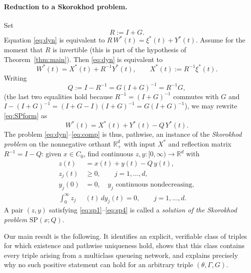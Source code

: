 \documentclass{amsart}
\theoremstyle{definition}
\theoremstyle{remark}
\newcommand{\R}{\mathbb{R}}
\begin{document}
\paragraph{Reduction to a Skorokhod problem.}
Set
\begin{equation}\label{eq:RQ}
  R:=I+G .
\end{equation}
Equation \eqref{eq:dyn} is equivalent to $R\,W^\ast(t)=\xi^\ast(t)+Y^\ast(t)$.
Assume for the moment that $R$ is invertible (this is part of the hypothesis of
Theorem~\ref{thm:main}). Then \eqref{eq:dyn} is equivalent to
\begin{equation}\label{eq:SPform}
  W^\ast(t)=X^\ast(t)+R^{-1}Y^\ast(t),\qquad
  X^\ast(t):=R^{-1}\xi^\ast(t).
\end{equation}
Writing
\begin{equation}\label{eq:Qdef}
  Q:=I-R^{-1}=G(I+G)^{-1}=R^{-1}G,
\end{equation}
(the last two equalities hold because $R^{-1}=(I+G)^{-1}$ commutes with $G$ and
$I-(I+G)^{-1}=(I+G-I)(I+G)^{-1}=G(I+G)^{-1}$), we may rewrite
\eqref{eq:SPform} as
\begin{equation}\label{eq:SPstd}
  W^\ast(t)=X^\ast(t)+Y^\ast(t)-Q\,Y^\ast(t).
\end{equation}
The problem \eqref{eq:dyn}--\eqref{eq:comp} is thus, pathwise, an instance of
the \emph{Skorokhod problem} on the nonnegative orthant $\R_+^d$ with input
$X^\ast$ and reflection matrix $R^{-1}=I-Q$: given $x\in C_0$, find continuous
$z,y:[0,\infty)\to\R^d$ with
\begin{align}
  z(t)&=x(t)+y(t)-Q\,y(t),\label{eq:sp1}\\
  z_j(t)&\ge 0,\qquad j=1,\dots,d,\label{eq:sp2}\\
  y_j(0)&=0,\quad y_j\text{ continuous nondecreasing},\label{eq:sp3}\\
  \int_0^\infty z_j&(t)\,dy_j(t)=0,\qquad j=1,\dots,d.\label{eq:sp4}
\end{align}
A pair $(z,y)$ satisfying \eqref{eq:sp1}--\eqref{eq:sp4} is called a
\emph{solution of the Skorokhod problem $\mathrm{SP}(x;Q)$}.

Our main result is the following. It identifies an explicit, verifiable class of
triples for which existence and pathwise uniqueness hold, shows that this class
contains every triple arising from a multiclass queueing network, and explains
precisely why no such positive statement can hold for an arbitrary triple
$(\theta,\Gamma,G)$.
\end{document}
